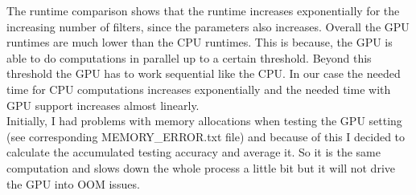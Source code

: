 \documentclass[paper=a4, fontsize=11pt]{scrartcl} %
\numberwithin{equation}{section} %
\numberwithin{figure}{section} %
\numberwithin{table}{section} %
\begin{document}
The runtime comparison shows that the runtime increases exponentially for the increasing number of filters, since the parameters also increases.
Overall the GPU runtimes are much lower than the CPU runtimes. This is because, the GPU is able to do computations in parallel up to a certain threshold. Beyond this threshold the GPU has to work sequential like the CPU. In our case
the needed time for CPU computations increases exponentially and the needed time with GPU support increases almost linearly. \\

Initially, I had problems with memory allocations when testing the GPU setting (see corresponding MEMORY\_ERROR.txt file) and because of this I decided to calculate the accumulated testing accuracy and average it. So it is the same computation and slows down the whole process a little bit but it will not drive the GPU into OOM issues.\\

%



\hfill
\end{document}
